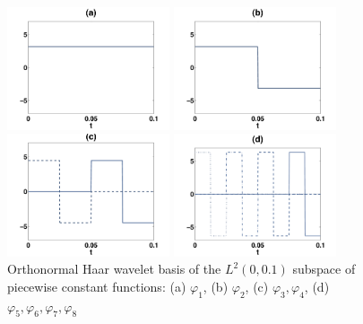 \documentclass[a4paper,10pt,BCOR=15mm]{scrbook}
\begin{document}
\begin{figure}[htbp]
  \centering
  \begin{minipage}[b]{4.8 cm}
    \includegraphics[width=4.8cm]{pics/wav1.pdf}  
  \end{minipage}
  \begin{minipage}[b]{4.8 cm}
    \includegraphics[width=4.8cm]{pics/wav2.pdf}  
  \end{minipage}
  \begin{minipage}[b]{4.8 cm}
    \includegraphics[width=4.8cm]{pics/wav34.pdf}  
  \end{minipage}
  \begin{minipage}[b]{4.8 cm}
    \includegraphics[width=4.8cm]{pics/wav5678.pdf}  
  \end{minipage}
  \caption{Orthonormal Haar wavelet basis of the $L^2(0,0.1)$ subspace of piecewise constant functions: (a) $\varphi_1$, (b) $\varphi_2$, (c) $\varphi_3,\varphi_4$, (d) $\varphi_5,\varphi_6,\varphi_7,\varphi_8$ }
  \label{haars}
\end{figure}
\end{document}
